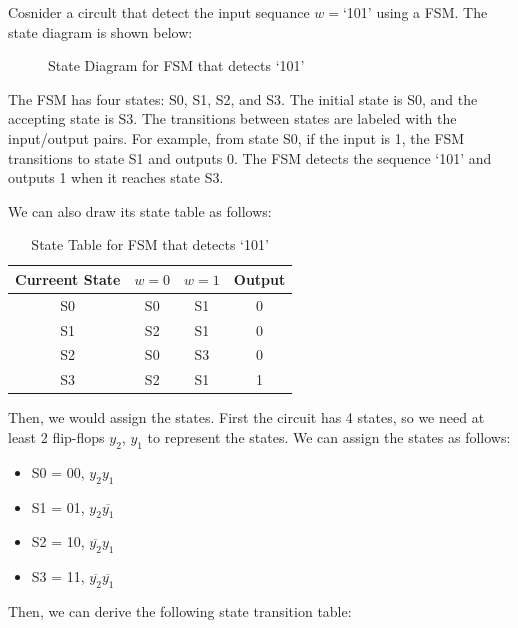 \documentclass[11pt]{report}
\begin{document}
\begin{example}
    Cosnider a circult that detect the input sequance $w=$`101' using a FSM. The state diagram is shown below:
    \begin{figure}[h!]
        \centering
        \caption{State Diagram for FSM that detects `101'}
        \label{fig:fsm_state_diagram}
    \end{figure}
    The FSM has four states: S0, S1, S2, and S3. The initial state is S0, and the accepting state is S3. The transitions between states are labeled with the input/output pairs. For example, from state S0, if the input is 1, the FSM transitions to state S1 and outputs 0. The FSM detects the sequence `101' and outputs 1 when it reaches state S3.
    
    We can also draw its state table as follows:
    \begin{table}[h!]
        \centering
        \begin{tabular}{|c|cc|c|}
            \hline
            Curreent State & $w=0$ & $w=1$ & Output \\
            \hline
            S0 & S0 & S1 & 0 \\
            S1 & S2 & S1 & 0 \\
            S2 & S0 & S3 & 0 \\
            S3 & S2 & S1 & 1 \\
            \hline
        \end{tabular}
        \caption{State Table for FSM that detects `101'}
        \label{tab:fsm_state_table}
    \end{table}

    Then, we would assign the states. First the circuit has 4 states, so we need at least 2 flip-flops $y_2$, $y_1$ to represent the states. We can assign the states as follows:
    \begin{itemize}
        \item S0 = 00, $y_2 y_1$
        \item S1 = 01, $y_2 \overline{y_1}$
        \item S2 = 10, $\overline{y_2} y_1$
        \item S3 = 11, $\overline{y_2} \overline{y_1}$
    \end{itemize}
    Then, we can derive the following state transition table:


\end{example}
\end{document}
